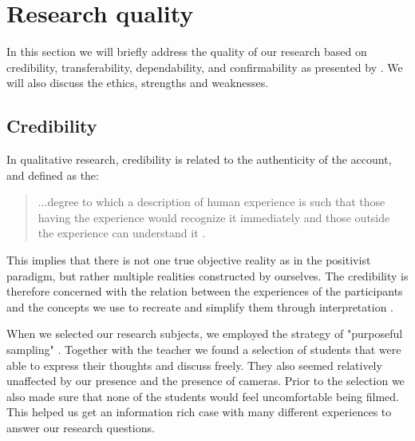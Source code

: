 


\section{Research quality}
In this section we will briefly address the quality of our research based on credibility, transferability, dependability, and confirmability as presented by \citet{baxter1997evaluating}. We will also discuss the ethics, strengths and weaknesses. 

\subsection{Credibility}
In qualitative research, credibility is related to the authenticity of the account, and defined as the: \begin{quote}...degree to which a description of human experience is such that those having the experience would recognize it immediately and those outside the experience can understand it \citetext{\citealp{lincoln1985naturalistic}, referenced in \citealp{baxter1997evaluating}, p. 512}.\end{quote}

This implies that there is not one true objective reality as in the positivist paradigm, but rather multiple realities constructed by ourselves. The credibility is therefore concerned with the relation between the experiences of the participants and the concepts we use to recreate and simplify them through interpretation \citep{baxter1997evaluating}.

When we selected our research subjects, we employed the strategy of "purposeful sampling" \citep[p. 513]{baxter1997evaluating}. Together with the teacher we found a selection of students that were able to express their thoughts and discuss freely. They also seemed relatively unaffected by our presence and the presence of cameras. Prior to the selection we also made sure that none of the students would feel uncomfortable being filmed. This helped us get an information rich case with many different experiences to answer our research questions. 

